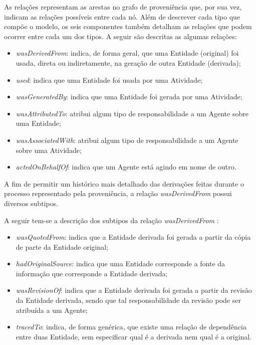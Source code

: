 As relações representam as arestas no grafo de proveniência que, por sua vez, indicam as relações possíveis entre cada nó. Além de descrever cada tipo que compõe o modelo, os seis componentes também detalham as relações que podem ocorrer entre cada um dos tipos. A seguir são descritas as algumas relações:

\begin{itemize}
\item \textit{wasDerivedFrom}: indica, de forma geral, que uma Entidade (original) foi usada, direta ou indiretamente, na geração de outra Entidade (derivada);
\item \textit{used}: indica que uma Entidade foi usada por uma Atividade;
\item \textit{wasGeneratedBy}: indica que uma Entidade foi gerada por uma Atividade;
\item \textit{wasAttributedTo}: atribui algum tipo de responsabilidade a um Agente sobre uma Entidade;
\item \textit{wasAssociatedWith}: atribui algum tipo de responsabilidade a um Agente sobre uma Atividade;
\item \textit{actedOnBehalfOf}: indica que um Agente está agindo em nome de outro.
\end{itemize}

A fim de permitir um histórico mais detalhado das derivações feitas durante o processo representado pela proveniência, a relação \textit{wasDerivedFrom} possui diversos subtipos.

A seguir tem-se a descrição dos subtipos da relação \textit{wasDerivedFrom} \cite{w3c}:

\begin{itemize}
\item \textit{wasQuotedFrom}: indica que a Entidade derivada foi gerada a partir da cópia de parte da Entidade original;
\item \textit{hadOriginalSource}: indica que uma Entidade corresponde a fonte da informação que corresponde a Entidade derivada;
\item \textit{wasRevisionOf}: indica que a Entidade derivada foi gerada a partir da revisão da Entidade derivada, sendo que tal responsabilidade da revisão pode ser atribuída a um Agente;
\item \textit{tracedTo}: indica, de forma genérica, que existe uma relação de dependência entre duas Entidade, sem especificar qual é a derivada nem qual é a original.
\end{itemize}

